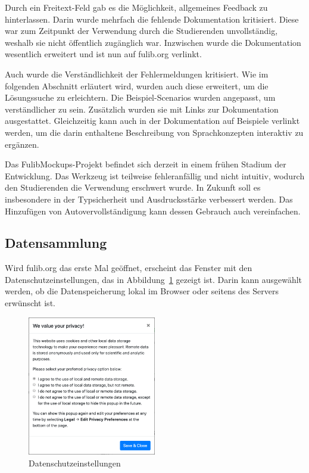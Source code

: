 Durch ein Freitext-Feld gab es die Möglichkeit, allgemeines Feedback zu hinterlassen.
Darin wurde mehrfach die fehlende Dokumentation kritisiert.
Diese war zum Zeitpunkt der Verwendung durch die Studierenden unvollständig, weshalb sie nicht öffentlich zugänglich war.
Inzwischen wurde die Dokumentation wesentlich erweitert und ist nun auf fulib.org verlinkt.

Auch wurde die Verständlichkeit der Fehlermeldungen kritisiert.
Wie im folgenden Abschnitt erläutert wird, wurden auch diese erweitert, um die Lösungssuche zu erleichtern.
Die Beispiel-Scenarios wurden angepasst, um verständlicher zu sein.
Zusätzlich wurden sie mit Links zur Dokumentation ausgestattet.
Gleichzeitig kann auch in der Dokumentation auf Beispiele verlinkt werden, um die darin enthaltene Beschreibung von Sprachkonzepten interaktiv zu ergänzen.

Das FulibMockups-Projekt befindet sich derzeit in einem frühen Stadium der Entwicklung.
Das Werkzeug ist teilweise fehleranfällig und nicht intuitiv, wodurch den Studierenden die Verwendung erschwert wurde.
In Zukunft soll es insbesondere in der Typsicherheit und Ausdrucksstärke verbessert werden.
Das Hinzufügen von Autovervollständigung kann dessen Gebrauch auch vereinfachen.

\subsection{Datensammlung}\label{subsec:data-collection}

Wird fulib.org das erste Mal geöffnet, erscheint das Fenster mit den Datenschutzeinstellungen, das in Abbildung~\ref{fig:privacy} gezeigt ist.
Darin kann ausgewählt werden, ob die Datenspeicherung lokal im Browser oder seitens des Servers erwünscht ist.

\begin{figure}
    \centering
    \includegraphics[width=0.5\textwidth]{chapter/fulib.org/img/privacy.png}
    \caption{Datenschutzeinstellungen}
    \label{fig:privacy}
\end{figure}

